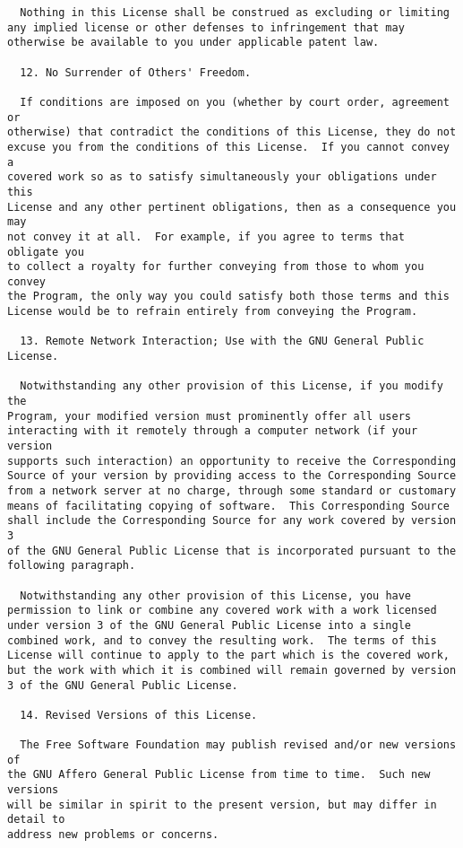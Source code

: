 \documentclass[11pt]{article}
\begin{document}
\begin{verbatim}
  Nothing in this License shall be construed as excluding or limiting
any implied license or other defenses to infringement that may
otherwise be available to you under applicable patent law.

  12. No Surrender of Others' Freedom.

  If conditions are imposed on you (whether by court order, agreement or
otherwise) that contradict the conditions of this License, they do not
excuse you from the conditions of this License.  If you cannot convey a
covered work so as to satisfy simultaneously your obligations under this
License and any other pertinent obligations, then as a consequence you may
not convey it at all.  For example, if you agree to terms that obligate you
to collect a royalty for further conveying from those to whom you convey
the Program, the only way you could satisfy both those terms and this
License would be to refrain entirely from conveying the Program.

  13. Remote Network Interaction; Use with the GNU General Public License.

  Notwithstanding any other provision of this License, if you modify the
Program, your modified version must prominently offer all users
interacting with it remotely through a computer network (if your version
supports such interaction) an opportunity to receive the Corresponding
Source of your version by providing access to the Corresponding Source
from a network server at no charge, through some standard or customary
means of facilitating copying of software.  This Corresponding Source
shall include the Corresponding Source for any work covered by version 3
of the GNU General Public License that is incorporated pursuant to the
following paragraph.

  Notwithstanding any other provision of this License, you have
permission to link or combine any covered work with a work licensed
under version 3 of the GNU General Public License into a single
combined work, and to convey the resulting work.  The terms of this
License will continue to apply to the part which is the covered work,
but the work with which it is combined will remain governed by version
3 of the GNU General Public License.

  14. Revised Versions of this License.

  The Free Software Foundation may publish revised and/or new versions of
the GNU Affero General Public License from time to time.  Such new versions
will be similar in spirit to the present version, but may differ in detail to
address new problems or concerns.


\end{verbatim}
\end{document}
